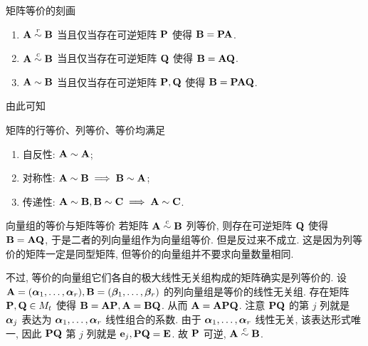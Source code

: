 \begin{frame}{矩阵等价的刻画}
	\onslide<+->
	\begin{theorem}
		\begin{enumerate}
			\item $\bfA\simr\bfB$ 当且仅当存在可逆矩阵 $\bfP$ 使得 $\bfB=\bfP\bfA$.
			\item $\bfA\simc\bfB$ 当且仅当存在可逆矩阵 $\bfQ$ 使得 $\bfB=\bfA\bfQ$.
			\item $\bfA\sim\bfB$ 当且仅当存在可逆矩阵 $\bfP,\bfQ$ 使得 $\bfB=\bfP\bfA\bfQ$.
		\end{enumerate}
	\end{theorem}
	\onslide<+->
	由此可知
	\begin{proposition}
		矩阵的行等价、列等价、等价均满足
		\begin{enumerate}
			\item 自反性: $\bfA\sim\bfA$;
			\item 对称性: $\bfA\sim\bfB\implies\bfB\sim\bfA$;
			\item 传递性: $\bfA\sim\bfB,\bfB\sim\bfC\implies\bfA\sim\bfC$.
		\end{enumerate}
	\end{proposition}
\end{frame}


\begin{frame}{向量组的等价与矩阵等价}
	\onslide<+->
	若矩阵 $\bfA\simc\bfB$ 列等价, 则存在可逆矩阵 $\bfQ$ 使得 $\bfB=\bfA\bfQ$, 于是二者的列向量组作为向量组等价.
	\onslide<+->
	但是反过来\alert{不成立}.
	\onslide<+->
	这是因为列等价的矩阵一定是同型矩阵, 但等价的向量组并不要求向量数量相同.

	\onslide<+->
	不过, 等价的向量组它们各自的极大线性无关组构成的矩阵确实是列等价的.
	\onslide<+->
	设 $\bfA=(\bma_1,\dots,\bma_r),\bfB=(\bmb_1,\dots,\bmb_r)$ 的列向量组是等价的线性无关组.
	\onslide<+->
	存在矩阵 $\bfP,\bfQ\in M_t$ 使得 $\bfB=\bfA\bfP,\bfA=\bfB\bfQ$.
	\onslide<+->
	从而 $\bfA=\bfA\bfP\bfQ$.
	\onslide<+->
	注意 $\bfP\bfQ$ 的第 $j$ 列就是 $\bma_j$ 表达为 $\bma_1,\dots,\bma_r$ 线性组合的系数.
	\onslide<+->
	由于 $\bma_1,\dots,\bma_r$ 线性无关, 该表达形式唯一, 因此 $\bfP\bfQ$ 第 $j$ 列就是 $\bfe_j, \bfP\bfQ=\bfE$.
	\onslide<+->
	故 $\bfP$ 可逆, $\bfA\simc\bfB$.
\end{frame}


